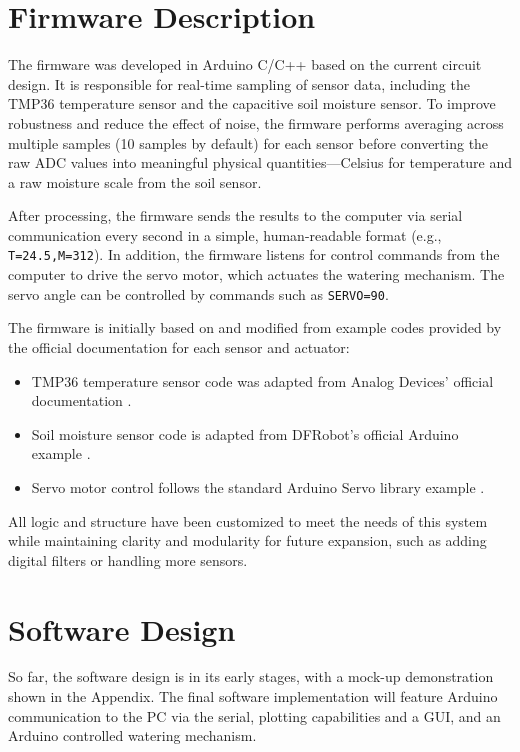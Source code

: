 \documentclass[a4paper,11pt]{article}
\begin{document}
\section{Firmware Description}

The firmware was developed in Arduino C/C++ based on the current circuit design. It is responsible for real-time sampling of sensor data, including the TMP36 temperature sensor and the capacitive soil moisture sensor. To improve robustness and reduce the effect of noise, the firmware performs averaging across multiple samples (10 samples by default) for each sensor before converting the raw ADC values into meaningful physical quantities—Celsius for temperature and a raw moisture scale from the soil sensor.

After processing, the firmware sends the results to the computer via serial communication every second in a simple, human-readable format (e.g., \texttt{T=24.5,M=312}). In addition, the firmware listens for control commands from the computer to drive the servo motor, which actuates the watering mechanism. The servo angle can be controlled by commands such as \texttt{SERVO=90}.

The firmware is initially based on and modified from example codes provided by the official documentation for each sensor and actuator:
\begin{itemize}
    \item TMP36 temperature sensor code was adapted from Analog Devices’ official documentation \cite{tmp36}.
    \item Soil moisture sensor code is adapted from DFRobot’s official Arduino example \cite{dfrobot}.
    \item Servo motor control follows the standard Arduino Servo library example \cite{arduino_servo}.
\end{itemize}
All logic and structure have been customized to meet the needs of this system while maintaining clarity and modularity for future expansion, such as adding digital filters or handling more sensors.

\section{Software Design}
\label{sec:Software_Design}


So far, the software design is in its early stages,
with a mock-up demonstration shown in the Appendix.
The final software implementation will feature 
Arduino communication to the PC via the serial,
plotting capabilities and a GUI,
and an Arduino controlled watering mechanism.
\end{document}
